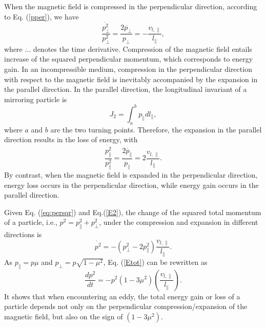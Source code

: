 \documentclass[preprint2,twocolumn,times,tighten]{aastex63}
\newcommand*{\xu}{\color{magenta}}
\begin{document}
{%
When the magnetic field is compressed in the perpendicular direction, according to Eq. (\ref{pper}), 
we have 
\begin{equation}\label{eq:persqr}
\frac{ \dot{p^2_\bot}}{p^2_\bot}=\frac{2\dot{p_{\bot}}}{p_{\bot}}=-\frac{v_{l,\|}}{l_\|},
\end{equation}
where $\dot{...}$ denotes the time derivative.
Compression of
the magnetic field entails increase of the squared perpendicular momentum,
which corresponds to energy gain. 
In an incompressible medium, compression in the perpendicular direction {with respect to the magnetic field} is inevitably accompanied by the expansion in the parallel direction. 
In the parallel direction,  the longitudinal invariant of a mirroring particle is 
\begin{equation}
J_2=\int^b_a p_{\|} d l_\|,
\end{equation}
where  
$a$ and $b$ are the two turning points.
Therefore, the expansion in the parallel direction results in the loss of energy, with
\begin{equation}
\frac{\dot{p^2_\|}}{p^2_\|}=\frac{2\dot{p_{\|}}}{p_{\|}}=2\frac{v_{l,\|}}{l_\|}.
\label{E2}
\end{equation}
By contrast, when the magnetic field is expanded in the perpendicular direction, 
energy loss occurs in the perpendicular direction, while energy gain occurs in the parallel direction. 

 
 
 Given Eq. (\ref{eq:persqr}) and Eq.(\ref{E2}), the change of the squared total momentum of a {particle}, i.e.,  $p^2=p_\|^2+p_\bot^2$, {under the compression and expansion in different directions} is 
 \begin{equation}
 \dot{p^2}=-(p^2_\bot-2p^2_\|)\frac{v_{l,\|}}{l_{\|}}.
 \label{Etot}
 \end{equation}
As $p_\|=p \mu$ and $p_\bot=p \sqrt{1-\mu^2}$, Eq. (\ref{Etot}) can be rewritten as 
\begin{equation}
\frac{d p^2}{dt}=-p^2(1-3\mu^2) \left(\frac{v_{l,\|}}{l_\|}\right).
\label{p2}
\end{equation}
It shows that when encountering an eddy, 
the total energy gain or loss of a particle depends not only on the perpendicular compression/expansion of the magnetic field, but also on 
the sign of 
$(1-3\mu^2)$. 




}
\end{document}
